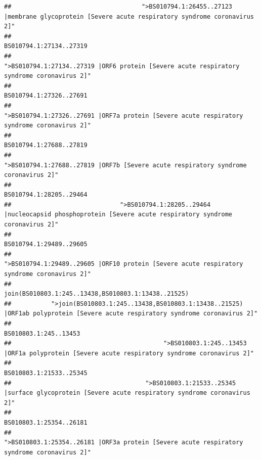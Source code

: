 \documentclass[
]{article}
\begin{document}
\begin{verbatim}
##                                    ">BS010794.1:26455..27123 |membrane glycoprotein [Severe acute respiratory syndrome coronavirus 2]" 
##                                                                                                                BS010794.1:27134..27319 
##                                             ">BS010794.1:27134..27319 |ORF6 protein [Severe acute respiratory syndrome coronavirus 2]" 
##                                                                                                                BS010794.1:27326..27691 
##                                            ">BS010794.1:27326..27691 |ORF7a protein [Severe acute respiratory syndrome coronavirus 2]" 
##                                                                                                                BS010794.1:27688..27819 
##                                                    ">BS010794.1:27688..27819 |ORF7b [Severe acute respiratory syndrome coronavirus 2]" 
##                                                                                                                BS010794.1:28205..29464 
##                              ">BS010794.1:28205..29464 |nucleocapsid phosphoprotein [Severe acute respiratory syndrome coronavirus 2]" 
##                                                                                                                BS010794.1:29489..29605 
##                                            ">BS010794.1:29489..29605 |ORF10 protein [Severe acute respiratory syndrome coronavirus 2]" 
##                                                                                    join(BS010803.1:245..13438,BS010803.1:13438..21525) 
##           ">join(BS010803.1:245..13438,BS010803.1:13438..21525) |ORF1ab polyprotein [Severe acute respiratory syndrome coronavirus 2]" 
##                                                                                                                  BS010803.1:245..13453 
##                                          ">BS010803.1:245..13453 |ORF1a polyprotein [Severe acute respiratory syndrome coronavirus 2]" 
##                                                                                                                BS010803.1:21533..25345 
##                                     ">BS010803.1:21533..25345 |surface glycoprotein [Severe acute respiratory syndrome coronavirus 2]" 
##                                                                                                                BS010803.1:25354..26181 
##                                            ">BS010803.1:25354..26181 |ORF3a protein [Severe acute respiratory syndrome coronavirus 2]" 

\end{verbatim}
\end{document}

